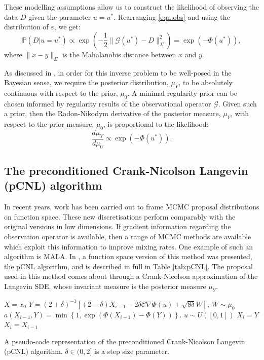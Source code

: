\documentclass[final]{siamltex}
\newcommand{\data}{D}
\begin{document}
These modelling assumptions allow us to construct the 
likelihood of observing the data $\data$ given the parameter $u =
u^*$. Rearranging \eqref{eqn:obs} and using the distribution of $\varepsilon$, we get:
\begin{equation}\label{eqn:like}
	\mathbb{P}(\data|u=u^*) \propto \exp \left ( -\frac{1}{2} \|\mathcal{G}(u^*)
	  - \data\|_\Sigma^2 \right ) = \exp\left(-\Phi(u^*)\right),
\end{equation}
where $\| x - y \|_\Sigma$ is the Mahalanobis distance between $x$ and $y$.

As discussed in \cite{stuart2010inverse,cotter2009bayesian},
in order for this inverse problem to be well-posed in the Bayesian
sense, we require the posterior distribution, $\mu_Y$, to be absolutely
continuous with respect to the prior, $\mu_0$. A
minimal regularity prior can be chosen informed by regularity results
of the observational operator $\mathcal{G}$. Given such a prior, then
the Radon-Nikodym derivative of the posterior measure, $\mu_Y$, with
respect to the prior measure, $\mu_0$, is proportional to the
likelihood:
\begin{equation}\label{eqn:RND}
	\frac{d\mu_Y}{d\mu_0} \propto \exp \left ( -\Phi(u^*) \right ).
\end{equation}

\subsection{The preconditioned Crank-Nicolson Langevin (pCNL) algorithm}\label{Sec:pCNL}
In recent years, work has been carried out to frame MCMC proposal
distributions on function space\cite{cotter2013mcmc}. These new
discretisations perform comparably with the original versions in low
dimensions. If gradient information regarding the observation operator is
available, then a range of MCMC methods are available which exploit this information to improve mixing rates. One
example of such an algorithm is MALA. In \cite{cotter2013mcmc}, a function space version of this
method was presented, the pCNL algorithm, and is described in full in Table
\ref{tab:pCNL}. The proposal used in this method comes about through
a Crank-Nicolson approximation of the Langevin SDE, whose invariant
measure is the posterior measure $\mu_Y$.

\begin{table}
\begin{mdframed}
\begin{algorithmic}
\STATE $X = x_0$
\STATE $Y = (2+\delta)^{-1}\left[(2 - \delta)X_{i-1}-
2\delta\mathcal{C}\nabla \Phi(u)+
\sqrt{8\delta} W\right] $, $W \sim \mu_0$
\STATE $a(X_{i-1},Y) = \min \left \{ 1,  \exp(\Phi(X_{i-1}) - \Phi(Y) ) \right \}$.
\STATE $u \sim U([0,1])$
\STATE $X_i = Y$
\ELSE 
\STATE $X_i = X_{i-1}$
\ENDIF
\ENDFOR
\end{algorithmic}
\end{mdframed}\caption{A pseudo-code representation of the preconditioned Crank-Nicolson Langevin
   (pCNL) algorithm. $\delta \in (0,2]$ is a step size parameter.}
\label{tab:pCNL}
\end{table}
\end{document}
